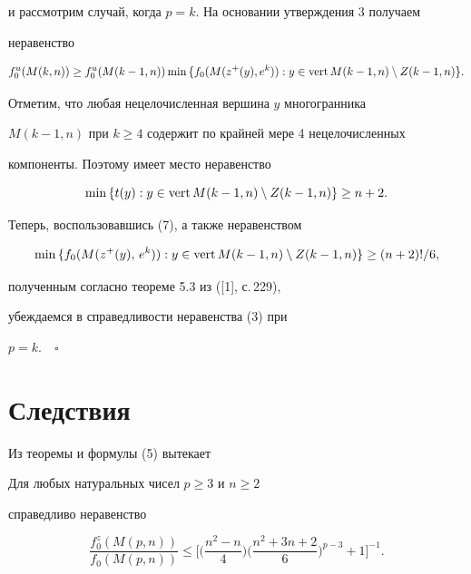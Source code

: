 и рассмотрим случай, когда $p=k$. На основании утверждения 3 получаем


неравенство 


$$


f^u_0(M(k,n))\geq f^u_0(M(k-1,n))\min{ \{f_0(M(z^+(y),e^k)) }:


y\in \vrt M(k-1,n)\setminus Z(k-1,n)\}.


$$





Отметим, что любая нецелочисленная вершина $y$ многогранника


$M(k-1,n)$ при $k\geq 4$ содержит по крайней мере 4 нецелочисленных


компоненты. Поэтому имеет место неравенство


$$


\min{ \{t(y): y\in \vrt M(k-1,n)\setminus Z(k-1,n)\} }\geq n+2.


$$





Теперь, воспользовавшись (7), а также неравенством


$$


\min{ \{f_0(M(z^+(y),\,e^k)) }: y\in \vrt M(k-1,n)


\setminus Z(k-1,n) \}\geq (n+2)!/6,


$$


полученным согласно теореме 5.3 из ([1], с.\,229),


убеждаемся в справедливости неравенства (3) при


$p=k.\quad\square$





\section{Следствия}





Из теоремы и формулы (5) вытекает





\begin{cor}


Для любых натуральных чисел $p\geq 3$ и $n\geq 2$


справедливо неравенство


$$


\frac{f^z_0(M(p,n))}{f_0(M(p,n))}\leq


\bigg[\bigg(\frac{n^2-n}{4}\bigg)


\bigg(\frac{n^2+3n+2}{6}\bigg)^{p-3}+1\bigg]^{-1}.


$$


\end{cor}





